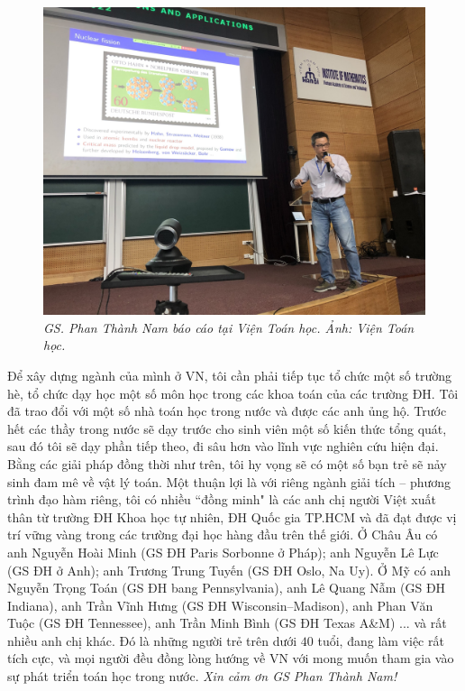 \begin{multicols}{2}
	\begin{figure}[H]
		\centering
		\vspace*{5pt}
		\captionsetup{labelformat= empty, justification=centering}
		\includegraphics[width=1\linewidth]{4}
		\caption{\small\textit{\color{diendantoanhoc}GS. Phan Thành Nam báo cáo tại Viện Toán học. Ảnh: Viện Toán học.}}
		\vspace*{-10pt}
	\end{figure}
	Để xây dựng ngành của mình ở VN, tôi cần phải tiếp tục tổ chức một số trường hè, tổ chức dạy học một số môn học trong các khoa toán của các trường ĐH. Tôi đã trao đổi với một số nhà toán học trong nước và được các anh ủng hộ. Trước hết các thầy trong nước sẽ dạy trước cho sinh viên một số kiến thức tổng quát, sau đó tôi sẽ dạy phần tiếp theo, đi sâu hơn vào lĩnh vực nghiên cứu hiện đại. Bằng các giải pháp đồng thời như trên, tôi hy vọng sẽ có một số bạn trẻ sẽ nảy sinh đam mê về vật lý toán.
	\vskip 0.1cm 
	Một thuận lợi là với riêng ngành giải tích -- phương trình đạo hàm riêng, tôi có nhiều ``đồng minh" là các anh chị người Việt xuất thân từ trường ĐH Khoa học tự nhiên, ĐH Quốc gia TP.HCM và đã đạt được vị trí vững vàng trong các trường đại học hàng đầu trên thế giới. Ở Châu Âu có anh Nguyễn Hoài Minh (GS ĐH Paris Sorbonne ở Pháp); anh Nguyễn Lê Lực (GS ĐH ở Anh); anh Trương Trung Tuyến (GS ĐH Oslo, Na Uy). Ở Mỹ có anh  Nguyễn Trọng Toán (GS ĐH bang Pennsylvania), anh Lê Quang Nẫm (GS ĐH Indiana), anh Trần Vĩnh Hưng (GS ĐH Wisconsin–Madison), anh Phan Văn  Tuộc (GS ĐH Tennessee), anh Trần Minh Bình (GS ĐH Texas A\&M) ... và rất nhiều anh chị khác. Đó là những người trẻ trên dưới $40$ tuổi, đang làm việc rất tích cực, và mọi người đều đồng lòng hướng về VN với mong muốn tham gia vào sự phát triển toán học trong nước.
	\vskip 0.1cm
	\textit{Xin cảm ơn GS Phan Thành Nam!} 
\end{multicols}